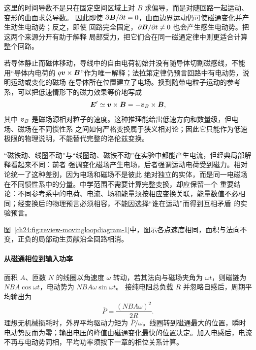 {这里的时间导数不是只在固定空间区域上对 $B$ 求偏导，而是对随回路一起运动、变形的曲面求总导数。
因此即使 $\partial\bm{B}/\partial t=0$，曲面边界运动仍可使磁通变化并产生动生电动势；反之，即使
回路完全固定，$\partial\bm{B}/\partial t\ne0$ 也会产生感生电动势。把这两个来源分开有助于解释
局部受力，把它们合在同一磁通定律中则更适合计算整个回路。

若导体静止而磁体移动，导线中的自由电荷初始并没有随导体切割磁感线，不能用“导体内电荷的
$q\bm{v}\times\bm{B}$”作为唯一解释；法拉第定律仍预言回路中有电动势，说明运动或变化的磁场
在导体所在位置建立了电场。换到随带电粒子运动的参考系，可以把低速情形下的磁力效果等价地写成
\begin{equation}
  \bm{E}'\simeq\bm{v}\times\bm{B}=-\bm{v}_B\times\bm{B},
\end{equation}
其中 $\bm{v}_B$ 是磁场源相对粒子的速度。这种推理能给出低速方向和数量级，但电场、磁场在不同惯性系
之间如何严格变换属于狭义相对论；因此它只能作为低速极限的物理说明，不能替代完整的洛伦兹变换。

“磁铁动、线圈不动”与“线圈动、磁铁不动”在实验中都能产生电流，但经典局部解释看起来不同：前者
强调变化磁场产生电场，后者强调运动电荷受到磁力。相对论统一了这种差别，因为电场和磁场不是彼此
绝对独立的实体，而是同一电磁场在不同惯性系中的分量。中学范围不需要计算完整变换，却应保留一个
重要结论：不同参考系中的电荷、电流、场和能量须按相应变换关联，能量数值不必相同；经变换后的物理预言必须相容，不能因选择“谁在运动”而得到互相矛盾
的实验预言。

图~\ref{ch24:fig:review-movingloopdiagram-1}中，图示各点速度相同，面积与法向不变，正负的局部动生贡献沿全回路相消。
\par\noindent\begin{minipage}{\linewidth}
\movingLoopDiagram
{}
\end{minipage}\par\medskip


\paragraph{从磁通相位到输入功率}
面积 $A$、匝数 $N$ 的线圈以角速度 $\omega$ 转动，若其法向与磁场夹角为 $\omega t$，则磁链为 $NBA\cos\omega t$，电动势为 $NBA\omega\sin\omega t$。
接纯电阻总负载 $R$ 并忽略自感后，周期平均输出为
\[
 \overline P=\frac{(NBA\omega)^2}{2R}.
\]
理想无机械损耗时，外界平均驱动力矩为 $\overline P/\omega$。线圈转到磁通最大的位置，瞬时电动势反而为零；输出电压的峰值由磁通变化最快的位置决定。加入电感后，电流不再与电动势同相，平均功率须按下一章的相位关系计算。


}
